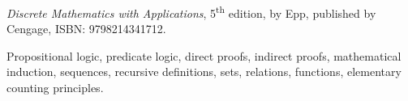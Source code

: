 \documentclass{osucourse}
\begin{document}
\CatalogDescription
\PrerequisitesAndExclusions

\begin{Text}
\emph{Discrete Mathematics with Applications}, 5\textsuperscript{th} edition, by Epp, published by Cengage, ISBN: 9798214341712.
\end{Text}

\begin{TopicsOutline}
Propositional logic, predicate logic, direct proofs, indirect proofs, mathematical induction,
sequences, recursive definitions, sets, relations, functions, elementary counting principles.
\end{TopicsOutline}
\end{document}
